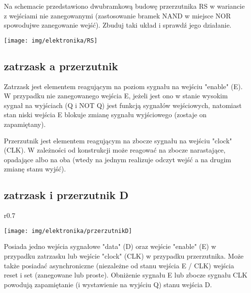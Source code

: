\documentclass{pdfBooklets}
\begin{document}
\begin{Zadanie}{}{}
\noindent\begin{minipage}[b]{0.6\textwidth}
Na schemacie przedstawiono dwubramkową budowę przerzutnika RS w wariancie z wejściami nie zanegowanymi (zastosowanie bramek NAND w miejsce NOR spowodujwe zanegowanie wejść). Zbuduj taki układ i sprawdź jego działanie.
\end{minipage}
\hfill
\begin{minipage}[b]{0.35\textwidth}
\texttt{[image: img/elektronika/RS]}
\end{minipage}
\end{Zadanie}

\subsection{zatrzask a przerzutnik}

Zatrzask jest elementem reagującym na poziom sygnału na wejściu "enable" (E). W przypadku nie zanegowanego wejścia E, jeżeli jest ono w stanie wysokim sygnał na wyjściach (Q i NOT Q) jest funkcją sygnałów wejściowych, natomiast stan niski wejścia E blokuje zmianę sygnału wyjściowego (zostaje on zapamiętany).

Przerzutnik jest elementem reagującym na zbocze sygnału na wejściu "clock" (CLK). W zależności od konstrukcji może reagować na zbocze narastające, opadające albo na oba (wtedy na jednym realizuje odczyt wejść a na drugim zmianę stanu wyjść).

\subsection{zatrzask i przerzutnik D}

\begin{wrapfigure}{r}{0.7\textwidth}
  \begin{center}
    \vspace{-25pt}
    \texttt{[image: img/elektronika/przerzutnikD]}
    \vspace{-25pt}
  \end{center}
\end{wrapfigure}

Posiada jedno wejścia sygnałowe "data" (D) oraz wejście "enable" (E) w przypadku zatrzasku lub wejście "clock" (CLK) w przypadku przerzutnika. Może także posiadać asynchroniczne (niezależne od stanu wejścia E / CLK) wejścia reset i set (zanegowane lub proste). Obniżenie sygnału E lub zbocze sygnału CLK powodują zapamiętanie (i wystawienie na wyjściu Q) stanu wejścia D.
\end{document}
